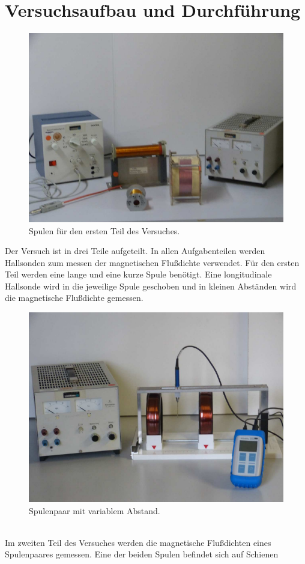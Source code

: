 \newpage
\section{Versuchsaufbau und Durchführung}
\label{sec:Durchführung}
\begin{figure}[h!]
        \centering
        \includegraphics[width=0.6\linewidth]{fotos/spulen.png}
        \caption{Spulen für den ersten Teil des Versuches.\cite{V308}}
        \label{fig:spulen}
\end{figure}
Der Versuch ist in drei Teile aufgeteilt. In allen Aufgabenteilen werden Hallsonden zum messen der magnetischen Flußdichte verwendet.
Für den ersten Teil werden eine lange und eine kurze Spule benötigt. Eine longitudinale Hallsonde wird in die jeweilige Spule geschoben 
und in kleinen Abständen wird die magnetische Flußdichte gemessen.
\\
\begin{figure}[h!]
    \centering
    \includegraphics[width=0.6\linewidth]{fotos/helmholtz.png}
    \caption{Spulenpaar mit variablem Abstand.\cite{V308}}
    \label{fig:helmholtz}
\end{figure}
\\
Im zweiten Teil des Versuches werden die magnetische Flußdichten eines Spulenpaares gemessen. Eine der beiden Spulen befindet sich auf Schienen 
